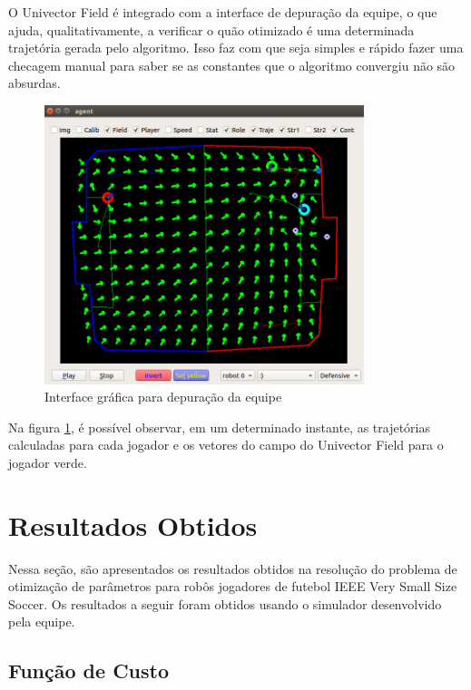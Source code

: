 \documentclass[a4paper,12pt]{article}
\begin{document}
O Univector Field é integrado com a interface de depuração da equipe, o que ajuda, qualitativamente, a verificar o quão otimizado é uma determinada trajetória gerada pelo algoritmo. Isso faz com que seja simples e rápido fazer uma checagem manual para saber se as constantes que o algoritmo convergiu não são absurdas.

\begin{figure}[H]
	\centering
	\includegraphics[width=0.83\textwidth]{figures/UnivectorFieldSimulatorDebugger.png}
	\caption{Interface gráfica para depuração da equipe}
	\label{fig:univector}
\end{figure}

Na figura \ref{fig:univector}, é possível observar, em um determinado instante, as trajetórias calculadas para cada jogador e os vetores do campo do Univector Field para o jogador verde.


\section{Resultados Obtidos}
	\label{secao: resultados_obtidos}
    
Nessa seção, são apresentados os resultados obtidos na resolução do problema de otimização de parâmetros para robôs jogadores de futebol IEEE Very Small Size Soccer. Os resultados a seguir foram obtidos usando o simulador desenvolvido pela equipe.

\subsection{Função de Custo}
\end{document}
